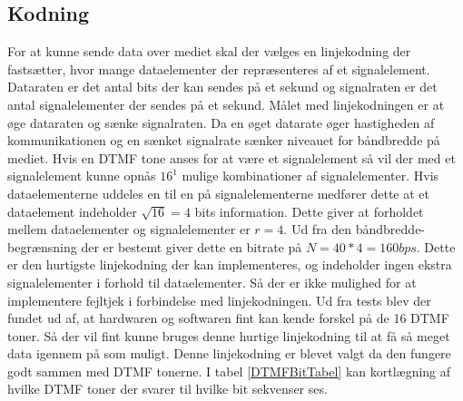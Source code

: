 \subsection{Kodning}
For at kunne sende data over mediet skal der vælges en linjekodning der fastsætter, hvor mange dataelementer der repræsenteres af et signalelement. Dataraten er det antal bits der kan sendes på et sekund og signalraten er det antal signalelementer der sendes på et sekund. Målet med linjekodningen er at øge dataraten og sænke signalraten. Da en øget datarate øger hastigheden af kommunikationen og en sænket signalrate sænker niveauet for båndbredde på mediet. Hvis en DTMF tone anses for at være et signalelement så vil der med et signalelement kunne opnås $16^{1}$ mulige kombinationer af signalelementer. Hvis dataelementerne uddeles en til en på signalelementerne medfører dette at et dataelement indeholder $\sqrt{16}=4$ bits information. Dette giver at forholdet mellem dataelementer og signalelementer er $r=4$. Ud fra den båndbredde-begrænsning der er bestemt giver dette en bitrate på $N=40*4=160bps$. Dette er den hurtigste linjekodning der kan implementeres, og indeholder ingen ekstra signalelementer i forhold til dataelementer. Så der er ikke mulighed for at implementere fejltjek i forbindelse med linjekodningen. Ud fra tests blev der fundet ud af, at hardwaren og softwaren fint kan kende forskel på de 16 DTMF toner. Så der vil fint kunne bruges denne hurtige linjekodning til at få så meget data igennem på som muligt. Denne linjekodning er blevet valgt da den fungere godt sammen med DTMF tonerne. I tabel \ref{DTMFBitTabel} kan kortlægning af hvilke DTMF toner der svarer til hvilke bit sekvenser ses.

